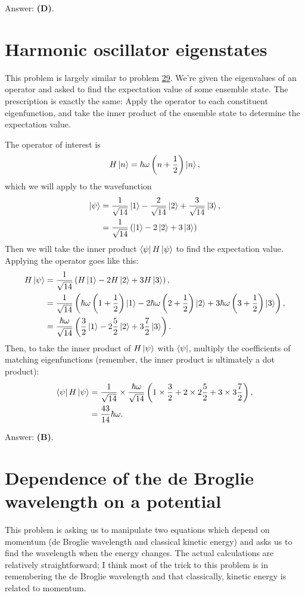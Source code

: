 \documentclass[11pt]{paper}
\newcommand{\answer}[1]{Answer: \textbf{(#1)}.}
\begin{document}
\answer{D}

\section{Harmonic oscillator eigenstates}
This problem is largely similar to problem \hyperlink{section.29}{29}.  We're given the eigenvalues of an operator and asked to find the expectation value of some ensemble state.  The prescription is exactly the same:  Apply the operator to each constituent eigenfunction, and take the inner product of the ensemble state to determine the expectation value.

The operator of interest is
\begin{equation}
H\ket{n} = \hbar \omega \left(n+\frac{1}{2}\right)\ket{n},
\end{equation}
which we will apply to the wavefunction
\begin{align}
\ket{\psi} &= \frac{1}{\sqrt{14}}\ket{1} - \frac{2}{\sqrt{14}}\ket{2} + \frac{3}{\sqrt{14}}\ket{3},\\
&= \frac{1}{\sqrt{14}}\left(\ket{1} - 2\ket{2} + 3\ket{3}\right)
\end{align}
Then we will take the inner product $\bra{\psi}H\ket{\psi}$ to find the expectation value.  Applying the operator goes like this:
\begin{align}
H\ket{\psi} &=  \frac{1}{\sqrt{14}}\left(H\ket{1} - 2H\ket{2} + 3H\ket{3}\right),\\
&=  \frac{1}{\sqrt{14}}\left(\hbar \omega \left(1+\frac{1}{2}\right)\ket{1} - 2\hbar \omega \left(2+\frac{1}{2}\right)\ket{2} + 3\hbar \omega \left(3+\frac{1}{2}\right)\ket{3}\right),\\
&= \frac{\hbar \omega}{\sqrt{14}}\left( \frac{3}{2}\ket{1} - 2 \frac{5}{2}\ket{2} + 3 \frac{7}{2}\ket{3}\right).
\end{align}
Then, to take the inner product of $H\ket{\psi}$ with $\bra{\psi}$, multiply the coefficients of matching eigenfunctions (remember, the inner product is ultimately a dot product):
\begin{align}
\bra{\psi}H\ket{\psi} &= \frac{1}{\sqrt{14}} \times \frac{\hbar\omega}{\sqrt{14}}\left(1\times\frac{3}{2} + 2\times2 \frac{5}{2}+3\times 3 \frac{7}{2}\right),\\
&= \frac{43}{14}\hbar\omega.
\end{align}

\answer{B}

\section{Dependence of the de Broglie wavelength on a potential}
This problem is asking us to manipulate two equations which depend on momentum (de Broglie wavelength and classical kinetic energy) and asks us to find the wavelength when the energy changes.  The actual calculations are relatively straightforward; I think most of the trick to this problem is in remembering the de Broglie wavelength and that classically, kinetic energy is related to momentum.
\end{document}
